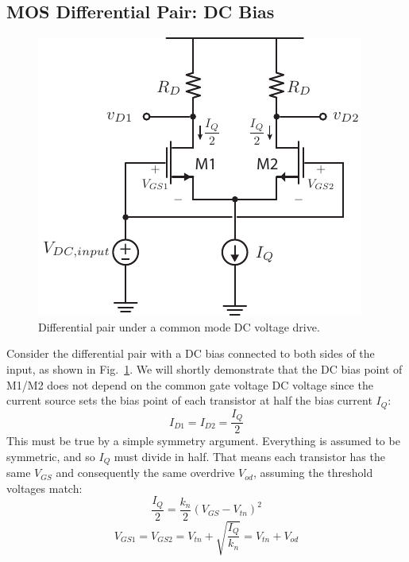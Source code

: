 \subsection{MOS Differential Pair:  DC Bias}
\begin{figure}[tb]
\centering
\includegraphics[scale=1]{diffamp_cm_dc.pdf}
\caption{Differential pair under a common mode DC voltage drive.}
\label{fig:diffamp_cm_dc.pdf}
\end{figure}
Consider the differential pair with a DC bias connected to both sides of the input, as shown in Fig.~\ref{fig:diffamp_cm_dc.pdf}.  We will shortly demonstrate that the DC bias point of M1/M2 does not depend on the common gate voltage DC voltage since the current source sets the bias point of each transistor at half the bias current $I_Q$:
    \begin{equation} 
        {I_{D1}} = {I_{D2}} = \frac{I_Q}{2}
    \end{equation}
This must be true by a simple symmetry argument. Everything is assumed to be symmetric, and so $I_Q$ must divide in half.  That means each transistor has the same $V_{GS}$ and consequently the same overdrive $V_{od}$, assuming the threshold voltages match:
    \begin{equation} 
        \frac{I_Q}{2} = \frac{{{k_n}}}{2}{\left( {{V_{GS}} - {V_{tn}}} \right)^2}
    \end{equation}
    \begin{equation}
        {V_{GS1}} = {V_{GS2}} = {V_{tn}} + \sqrt {\frac{I_Q}{{{k_n}}}}   = V_{tn} + V_{od}
    \end{equation}
